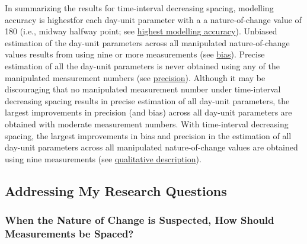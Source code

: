 \documentclass[
12pt, %
twoside,
english]{guelphthesis}
\theoremstyle{definition}
\theoremstyle{definition}
\theoremstyle{definition}
\theoremstyle{definition}
\theoremstyle{remark}
\begin{document}
In summarizing the results for time-interval decreasing spacing, modelling accuracy is highestfor each day-unit parameter with a a nature-of-change value of 180 (i.e., midway halfway point; see \protect\hyperlink{nature-change-time-dec-exp1}{highest modelling accuracy}). Unbiased estimation of the day-unit parameters across all manipulated nature-of-change values results from using nine or more measurements (see \protect\hyperlink{bias-time-dec-exp1}{bias}). Precise estimation of all the day-unit parameters is never obtained using any of the manipulated measurement numbers (see \protect\hyperlink{precision-time-dec-exp1}{precision}). Although it may be discouraging that no manipulated measurement number under time-interval decreasing spacing results in precise estimation of all day-unit parameters, the largest improvements in precision (and bias) across all day-unit parameters are obtained with moderate measurement numbers. With time-interval decreasing spacing, the largest improvements in bias and precision in the estimation of all day-unit parameters across all manipulated nature-of-change values are obtained using nine measurements (see \protect\hyperlink{qualitative-time-inc-exp1}{qualitative description}).

\hypertarget{addressing-my-research-questions}{%
\subsection{Addressing My Research Questions}\label{addressing-my-research-questions}}

\hypertarget{when-the-nature-of-change-is-suspected-how-should-measurements-be-spaced}{%
\subsubsection{When the Nature of Change is Suspected, How Should Measurements be Spaced?}\label{when-the-nature-of-change-is-suspected-how-should-measurements-be-spaced}}
\end{document}
